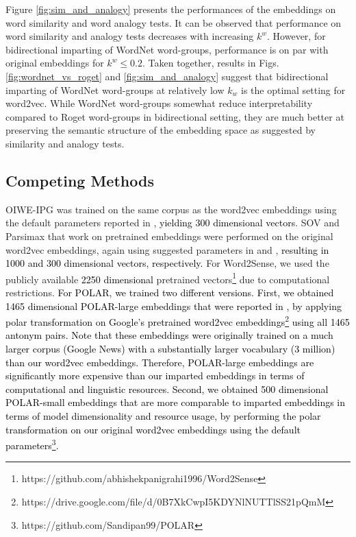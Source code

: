 \documentclass[11pt,a4paper]{article}
\begin{document}
Figure \ref{fig:sim_and_analogy} presents the performances of the embeddings on word similarity and word analogy tests. It can be observed that performance on word similarity and analogy tests decreases with increasing $k^w$.  However, for bidirectional imparting of WordNet word-groups, performance is on par with original embeddings for $k^w \leq 0.2$. Taken together, results in Figs. \ref{fig:wordnet_vs_roget} and \ref{fig:sim_and_analogy} suggest that bidirectional imparting of WordNet word-groups at relatively low $k_w$ is the optimal setting for word2vec. While WordNet word-groups somewhat reduce interpretability compared to Roget word-groups in bidirectional setting, they are much better at preserving the semantic structure of the embedding space as suggested by similarity and analogy tests.
 
 
 
 
 
 
 
 
 \subsection{Competing Methods}
 \label{app:competing_methods}
 
 OIWE-IPG was trained on the same corpus as the word2vec embeddings using the default parameters reported in \citep{luo15online} \textcolor{black}{, yielding 300 dimensional vectors}. SOV and Parsimax that work on pretrained embeddings were performed on the original word2vec embeddings, again using suggested parameters in \citep{faruqui15sparse} and \citep{park17rotated}, \textcolor{black}{resulting in 1000 and 300 dimensional vectors, respectively.} For Word2Sense, we used the publicly available \textcolor{black}{2250 dimensional} pretrained vectors\footnote{https://github.com/abhishekpanigrahi1996/Word2Sense} due to computational restrictions. \textcolor{black}{For POLAR, we trained two different versions. First, we obtained 1465 dimensional POLAR-large embeddings that were reported in \citep{mathew20polar}, by applying polar transformation on Google's pretrained word2vec embeddings\footnote{https://drive.google.com/file/d/0B7XkCwpI5KDYNlNUTTlSS21pQmM} using all 1465 antonym pairs. Note that these embeddings were originally trained on a much larger corpus (Google News) with a substantially larger vocabulary (3 million) than our word2vec embeddings. Therefore, POLAR-large embeddings are significantly more expensive than our imparted embeddings in terms of computational and linguistic resources. Second, we obtained 500 dimensional POLAR-small embeddings that are more comparable to imparted embeddings in terms of model dimensionality and resource usage, by performing the polar transformation on our original word2vec embeddings using the default parameters\footnote{https://github.com/Sandipan99/POLAR}.} 
 
\end{document}
